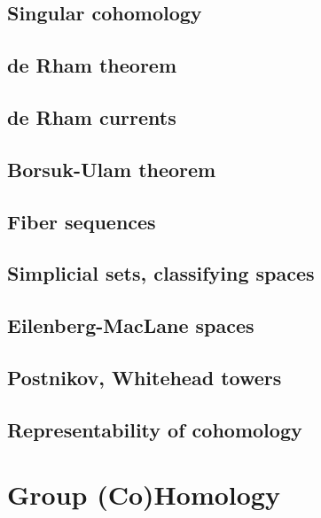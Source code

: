 \section{Singular cohomology}

\section{de Rham theorem}


\section{de Rham currents}

\section{Borsuk-Ulam theorem}


\section{Fiber sequences}

\section{Simplicial sets, classifying spaces}


\section{Eilenberg-MacLane spaces}



\section{Postnikov, Whitehead towers}


\section{Representability of cohomology}






\clearpage
\chapter{Group (Co)Homology}

